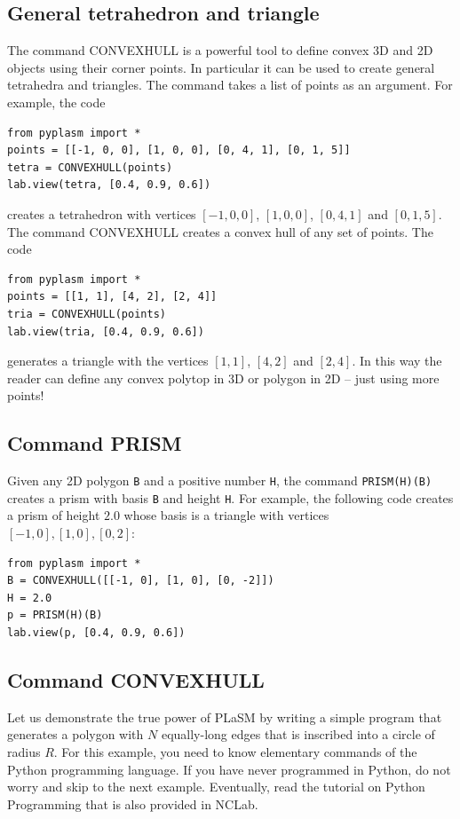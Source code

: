\documentclass{article}
\begin{document}
\subsection{General tetrahedron and triangle}

The command CONVEXHULL is a powerful tool to define convex 3D and 2D objects using 
their corner points. In particular it can be used to create general tetrahedra and 
triangles. The command takes a list of points as an argument. For example, the code

\begin{verbatim}
from pyplasm import *
points = [[-1, 0, 0], [1, 0, 0], [0, 4, 1], [0, 1, 5]]
tetra = CONVEXHULL(points)
lab.view(tetra, [0.4, 0.9, 0.6])
\end{verbatim}
creates a tetrahedron with vertices $[-1, 0, 0]$, $[1, 0, 0]$, $[0, 4, 1]$ and $[0, 1, 5]$.
The command CONVEXHULL creates a convex hull of any set of points. The code

\begin{verbatim}
from pyplasm import *
points = [[1, 1], [4, 2], [2, 4]]
tria = CONVEXHULL(points)
lab.view(tria, [0.4, 0.9, 0.6])
\end{verbatim}
generates a triangle with the vertices $[1, 1]$, $[4, 2]$ and $[2, 4]$. In this way 
the reader can define any convex polytop in 3D or polygon in 2D -- just using more 
points!

\subsection{Command PRISM}

Given any 2D polygon {\tt B} and a positive number {\tt H}, the command {\tt PRISM(H)(B)} 
creates a prism with basis {\tt B} and height {\tt H}. For example, the 
following code creates a prism of height $2.0$ whose basis is a triangle 
with vertices $[-1, 0], [1, 0], [0, 2]$:

\begin{verbatim}
from pyplasm import *
B = CONVEXHULL([[-1, 0], [1, 0], [0, -2]])
H = 2.0
p = PRISM(H)(B)
lab.view(p, [0.4, 0.9, 0.6])
\end{verbatim}

\subsection{Command CONVEXHULL}\label{par:chull}

Let us demonstrate the true power of PLaSM by writing a simple program that generates 
a polygon with $N$ equally-long edges that is inscribed into a circle of radius $R$.
For this example, you need to know elementary commands of the Python programming 
language. If you have never programmed in Python, do not worry and skip to the next 
example. Eventually, read the tutorial on Python Programming that is also provided
in NCLab.
\end{document}
